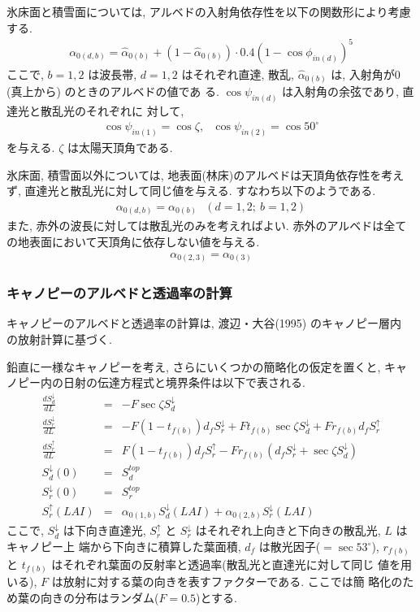 氷床面と積雪面については, アルベドの入射角依存性を以下の関数形により考慮
する.
\begin{eqnarray}
 \alpha_{0(d,b)} = \hat{\alpha}_{0(b)} + ( 1 - \hat{\alpha}_{0(b)} )
                         \cdot 0.4 ( 1 - \cos \phi_{in(d)} )^5
\end{eqnarray}
ここで, $b=1,2$ は波長帯, $d=1,2$ はそれぞれ直達, 散乱,
$\hat{\alpha}_{0(b)}$ は, 入射角が$0$ (真上から) のときのアルベドの値であ
る. $\cos \psi_{in(d)}$ は入射角の余弦であり, 直達光と散乱光のそれぞれに
対して,
\begin{eqnarray}
 \cos\psi_{in(1)} = \cos\zeta, \ \ \
 \cos\psi_{in(2)} = \cos 50^{\circ}
\end{eqnarray}
を与える. $\zeta$ は太陽天頂角である.

氷床面, 積雪面以外については, 地表面(林床)のアルベドは天頂角依存性を考え
ず, 直達光と散乱光に対して同じ値を与える. すなわち以下のようである.
\begin{eqnarray}
 \alpha_{0(d,b)} = \alpha_{0(b)}\ \ \ (d=1,2;\ b=1,2)
\end{eqnarray}
また, 赤外の波長に対しては散乱光のみを考えればよい. 赤外のアルベドは全て
の地表面において天頂角に依存しない値を与える.
\begin{eqnarray}
 \alpha_{0(2,3)} = \alpha_{0(3)}
\end{eqnarray}

\subsubsection{キャノピーのアルベドと透過率の計算}

キャノピーのアルベドと透過率の計算は, 渡辺・大谷(1995) のキャノピー層内
の放射計算に基づく.

鉛直に一様なキャノピーを考え, さらにいくつかの簡略化の仮定を置くと, キャ
ノピー内の日射の伝達方程式と境界条件は以下で表される.
\begin{eqnarray}
 \frac{dS^{\downarrow}_d}{dL} &=& -F \sec\zeta S^{\downarrow}_d \\
 \frac{dS^{\downarrow}_r}{dL} &=& -F (1-t_{f(b)})d_f S^{\downarrow}_r
                                  +F t_{f(b)} \sec\zeta S^{\downarrow}_d
                                  +F r_{f(b)} d_f S^{\uparrow}_r \\
 \frac{dS^{\uparrow}_r}{dL}   &=&  F (1-t_{f(b)})d_f S^{\uparrow}_r
                                  -F r_{f(b)} ( d_f S^{\downarrow}_r
                                         + \sec\zeta S^{\downarrow}_d ) \\
 S^{\downarrow}_d(0) &=& S^{top}_d \\
 S^{\downarrow}_r(0) &=& S^{top}_r \\
 S^{\uparrow}_r(LAI) &=& \alpha_{0(1,b)}S^{\downarrow}_d(LAI)
                       + \alpha_{0(2,b)}S^{\downarrow}_r(LAI)
\end{eqnarray}
ここで, $S^{\downarrow}_d$ は下向き直達光, $S^{\uparrow}_r$ と
$S^{\downarrow}_r$ はそれぞれ上向きと下向きの散乱光, $L$ はキャノピー上
端から下向きに積算した葉面積, $d_f$ は散光因子($=\sec 53^{\circ}$),
$r_{f(b)}$ と $t_{f(b)}$ はそれぞれ葉面の反射率と透過率(散乱光と直達光に対して同じ
値を用いる), $F$ は放射に対する葉の向きを表すファクターである. ここでは簡
略化のため葉の向きの分布はランダム($F=0.5$)とする.

